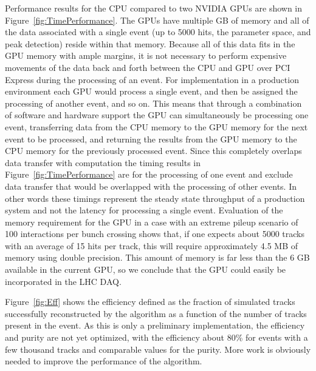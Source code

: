 \documentclass{JINST}
\begin{document}
Performance results for the CPU compared to two NVIDIA GPUs are shown in Figure~\ref{fig:TimePerformance}.
The GPUs have multiple GB of memory and all of the data associated with a single event (up to 5000 hits, the
parameter space, and peak detection) reside within that memory.  Because all of this data fits in the GPU
memory with ample margins, it is not necessary to perform expensive movements of the data back and forth
between the CPU and GPU over PCI Express during the processing of an event.  For implementation in a
production environment each GPU would process a single event, and then be assigned the processing of another
event, and so on.  This means that through a combination of software and hardware support the GPU can
simultaneously be processing one event, transferring data from the CPU memory to the GPU memory for the next
event to be processed, and returning the results from the GPU memory to the CPU memory for the previously
processed event.  Since this completely overlaps data transfer with computation the timing results in
Figure~\ref{fig:TimePerformance} are for the processing of one event and exclude data transfer that would be
overlapped with the processing of other events.  In other words these timings represent the steady state
throughput of a production system and not the latency for processing a single event.
Evaluation of the memory requirement for the GPU in a case with an extreme pileup scenario of 100 
interactions per bunch crossing shows that, if one expects about 5000 tracks with an average of 15 
hits per track, this will require approximately 4.5 MB of memory using double precision. This amount 
of memory is far less than the 6 GB available in the current GPU, so we conclude that the GPU could 
easily be incorporated in the LHC DAQ.


Figure~\ref{fig:Eff} shows the efficiency defined as the fraction of simulated tracks successfully
reconstructed by the algorithm as a function of the number of tracks present in the event. As this is only a preliminary 
implementation, the efficiency and purity are not yet optimized, with the efficiency about 80\% for events with a few 
thousand tracks and comparable values for the purity. More work is obviously needed to improve the performance of the 
algorithm.
\end{document}

